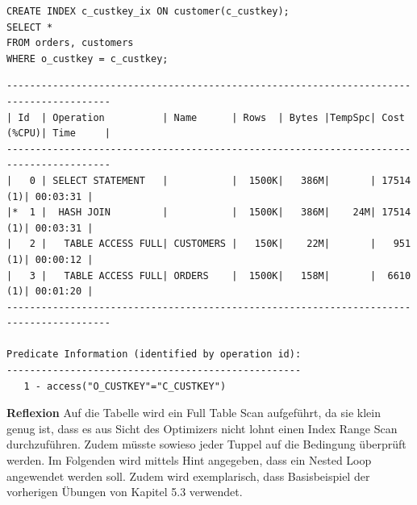 \documentclass[10pt]{article}
\begin{document}
\begin{lstlisting}[style=sql]
CREATE INDEX c_custkey_ix ON customer(c_custkey);
SELECT *
FROM orders, customers
WHERE o_custkey = c_custkey;
\end{lstlisting}
\begin{lstlisting}[style=queryexecutionplan]
----------------------------------------------------------------------------------------
| Id  | Operation          | Name      | Rows  | Bytes |TempSpc| Cost (%CPU)| Time     |
----------------------------------------------------------------------------------------
|   0 | SELECT STATEMENT   |           |  1500K|   386M|       | 17514   (1)| 00:03:31 |
|*  1 |  HASH JOIN         |           |  1500K|   386M|    24M| 17514   (1)| 00:03:31 |
|   2 |   TABLE ACCESS FULL| CUSTOMERS |   150K|    22M|       |   951   (1)| 00:00:12 |
|   3 |   TABLE ACCESS FULL| ORDERS    |  1500K|   158M|       |  6610   (1)| 00:01:20 |
----------------------------------------------------------------------------------------
 
Predicate Information (identified by operation id):
---------------------------------------------------
   1 - access("O_CUSTKEY"="C_CUSTKEY")
\end{lstlisting}
\textbf{Reflexion} \newline
Auf die Tabelle wird ein Full Table Scan aufgeführt, da sie klein genug ist, dass es aus Sicht des Optimizers nicht lohnt einen Index Range Scan durchzuführen.
Zudem müsste sowieso jeder Tuppel auf die Bedingung überprüft werden. \newline
\newline
Im Folgenden wird mittels Hint angegeben, dass ein Nested Loop angewendet werden soll.\newline
Zudem wird exemplarisch, dass Basisbeispiel der vorherigen Übungen von Kapitel 5.3 verwendet.\newline
\end{document}
